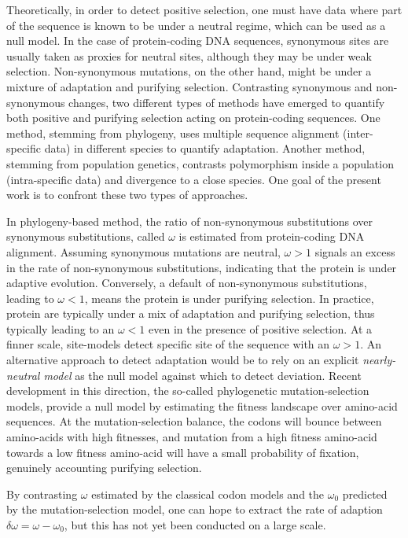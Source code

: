 \documentclass{article}
\begin{document}
Theoretically, in order to detect positive selection, one must have data where part of the sequence is known to be under a neutral regime, which can be used as a null model.
In the case of protein-coding DNA sequences, synonymous sites are usually taken as proxies for neutral sites, although they may be under weak selection.
Non-synonymous mutations, on the other hand, might be under a mixture of adaptation and purifying selection.
Contrasting synonymous and non-synonymous changes, two different types of methods have emerged to quantify both positive and purifying selection acting on protein-coding sequences.
One method, stemming from phylogeny, uses multiple sequence alignment (inter-specific data) in different species to quantify adaptation.
Another method, stemming from population genetics, contrasts polymorphism inside a population (intra-specific data) and divergence to a close species.
One goal of the present work is to confront these two types of approaches.

In phylogeny-based method, the ratio of non-synonymous substitutions over synonymous substitutions, called $\omega$ is estimated from protein-coding DNA alignment\cite{muse_likelihood_1994,goldman_codon-based_1994}.
Assuming synonymous mutations are neutral, $\omega>1$ signals an excess in the rate of non-synonymous substitutions, indicating that the protein is under adaptive evolution.
Conversely, a default of non-synonymous substitutions, leading to $\omega<1$, means the protein is under purifying selection.
In practice, protein are typically under a mix of adaptation and purifying selection, thus typically leading to an $\omega<1$ even in the presence of positive selection.
At a finner scale, site-models detect specific site of the sequence with an $\omega>1$\cite{yang_codon-substitution_2000, kosiol_patterns_2008}.
An alternative approach to detect adaptation would be to rely on an explicit \textit{nearly-neutral model} as the null model against which to detect deviation.
Recent development in this direction, the so-called phylogenetic mutation-selection models, provide a null model by estimating the fitness landscape over amino-acid sequences\cite{yang_mutation-selection_2008, halpern_evolutionary_1998, rodrigue_mechanistic_2010}.
At the mutation-selection balance, the codons will bounce between amino-acids with high fitnesses, and mutation from a high fitness amino-acid towards a low fitness amino-acid will have a small probability of fixation, genuinely accounting purifying selection.

By contrasting $ \omega $ estimated by the classical codon models and the $ \omega_0 $ predicted by the mutation-selection model, one can hope to extract the rate of adaption $ \delta \omega = \omega - \omega_0 $, but this has not yet been conducted on a large scale\cite{rodrigue_detecting_2016}.
\end{document}
